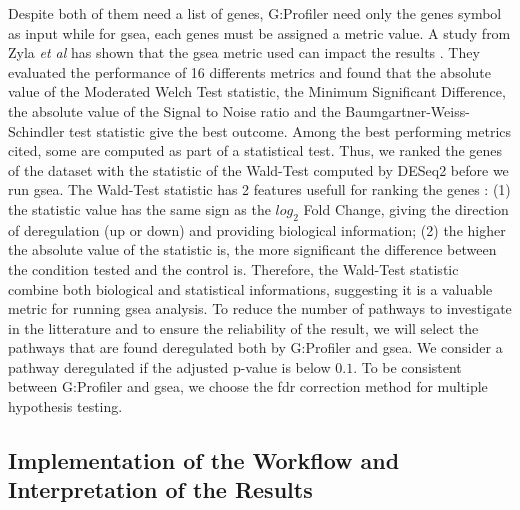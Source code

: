 Despite both of them need a list of genes, G:Profiler need only the genes symbol as input while for \acrshort{gsea}, each genes must be assigned a metric value.
A study from Zyla \textit{et al} has shown that the \acrshort{gsea} metric used can impact the results \cite*{Zyla2017}.
They evaluated the performance of 16 differents metrics and found that the absolute value of the Moderated Welch Test statistic, the Minimum Significant Difference, the absolute value of the Signal to Noise ratio and the Baumgartner-Weiss-Schindler test statistic give the best outcome.
Among the best performing metrics cited, some are computed as part of a statistical test.
Thus, we ranked the genes of the dataset with the statistic of the Wald-Test computed by DESeq2 before we run \acrshort{gsea}.
The Wald-Test statistic has 2 features usefull for ranking the genes : (1) the statistic value has the same sign as the $log_2$ Fold Change, giving the direction of deregulation (up or down) and providing biological information; (2) the higher the absolute value of the statistic is, the more significant the difference between the condition tested and the control is.
Therefore, the Wald-Test statistic combine both biological and statistical informations, suggesting it is a valuable metric for running \acrshort{gsea} analysis.
To reduce the number of pathways to investigate in the litterature and to ensure the reliability of the result, we will select the pathways that are found deregulated both by G:Profiler and \acrshort{gsea}.
We consider a pathway deregulated if the adjusted p-value is below $0.1$.
To be consistent between G:Profiler and \acrshort{gsea}, we choose the \acrfull{fdr} correction method for multiple hypothesis testing.


\subsection{Implementation of the Workflow and Interpretation of the Results}

